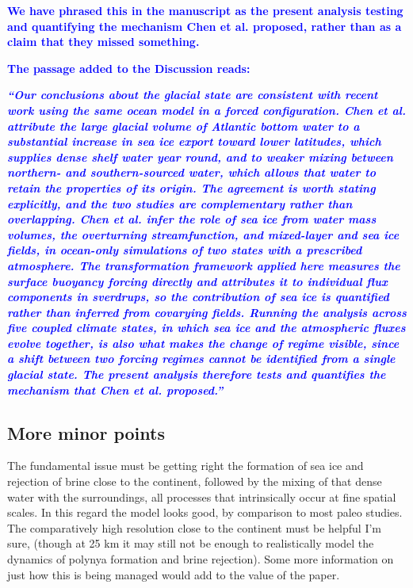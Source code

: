 \documentclass[pdflatex,sn-nature]{sn-jnl}
\begin{document}
\noindent\textcolor{blue}{\textbf{We have phrased this in the manuscript as the present analysis testing and quantifying the mechanism Chen et al. proposed, rather than as a claim that they missed something.}}


\noindent\textcolor{blue}{\textbf{The passage added to the Discussion reads:}}


\medskip
\noindent\textcolor{blue}{\textbf{\textit{``Our conclusions about the glacial state are consistent with recent work using the same ocean model in a forced configuration. Chen et al. attribute the large glacial volume of Atlantic bottom water to a substantial increase in sea ice export toward lower latitudes, which supplies dense shelf water year round, and to weaker mixing between northern- and southern-sourced water, which allows that water to retain the properties of its origin. The agreement is worth stating explicitly, and the two studies are complementary rather than overlapping. Chen et al. infer the role of sea ice from water mass volumes, the overturning streamfunction, and mixed-layer and sea ice fields, in ocean-only simulations of two states with a prescribed atmosphere. The transformation framework applied here measures the surface buoyancy forcing directly and attributes it to individual flux components in sverdrups, so the contribution of sea ice is quantified rather than inferred from covarying fields. Running the analysis across five coupled climate states, in which sea ice and the atmospheric fluxes evolve together, is also what makes the change of regime visible, since a shift between two forcing regimes cannot be identified from a single glacial state. The present analysis therefore tests and quantifies the mechanism that Chen et al. proposed.''}}}
\medskip

\subsection*{More minor points}

\medskip
\noindent The fundamental issue must be getting right the formation of sea ice and rejection of brine close to the continent, followed by the mixing of that dense water with the surroundings, all processes that intrinsically occur at fine spatial scales. In this regard the model looks good, by comparison to most paleo studies. The comparatively high resolution close to the continent must be helpful I'm sure, (though at 25 km it may still not be enough to realistically model the dynamics of polynya formation and brine rejection). Some more information on just how this is being managed would add to the value of the paper.
\medskip
\end{document}
